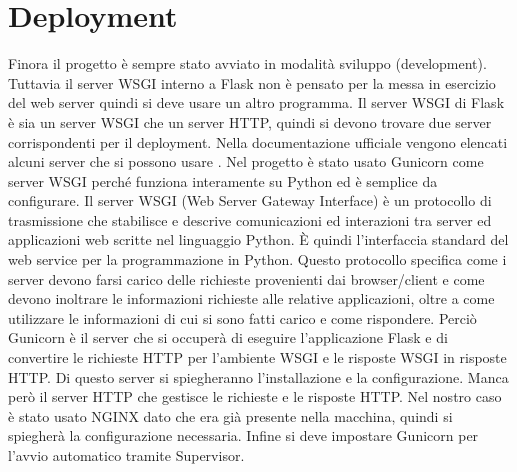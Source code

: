\section{Deployment}
\label{sec:flask-produzione}
Finora il progetto è sempre stato avviato in modalità sviluppo (development).
Tuttavia il server WSGI interno a Flask non è pensato per la messa in esercizio del web server 
quindi si deve usare un altro programma.
Il server WSGI di Flask è sia un server WSGI che un server HTTP, 
quindi si devono trovare due server corrispondenti per il deployment.
Nella documentazione ufficiale vengono elencati alcuni server che si possono usare \cite{flask-doc-deploying}.
Nel progetto è stato usato Gunicorn come server WSGI perché funziona interamente su Python ed è semplice da configurare.
Il server WSGI (Web Server Gateway Interface) è un protocollo di trasmissione che stabilisce e descrive comunicazioni 
ed interazioni tra server ed applicazioni web scritte nel linguaggio Python.
È quindi l'interfaccia standard del web service per la programmazione in Python.
Questo protocollo specifica come i server devono farsi carico delle richieste provenienti dai browser/client e
come devono inoltrare le informazioni richieste alle relative applicazioni, 
oltre a come utilizzare le informazioni di cui si sono fatti carico e come rispondere.
Perciò Gunicorn è il server che si occuperà di eseguire l'applicazione Flask e 
di convertire le richieste HTTP per l'ambiente WSGI e le risposte WSGI in risposte HTTP.
Di questo server si spiegheranno l'installazione e la configurazione.
Manca però il server HTTP che gestisce le richieste e le risposte HTTP.
Nel nostro caso è stato usato NGINX dato che era già presente nella macchina, 
quindi si spiegherà la configurazione necessaria.
Infine si deve impostare Gunicorn per l'avvio automatico tramite Supervisor.

